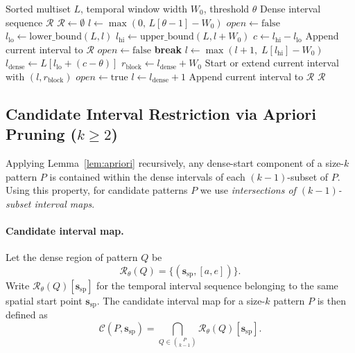 \begin{algorithm}[t]
\caption{Duplicate-aware dense interval computation for a fixed spatial start point}
\label{alg:t_stride}
\begin{algorithmic}[1]
\Require Sorted multiset $L$, temporal window width $W_0$, threshold $\theta$
\Ensure Dense interval sequence $\mathcal{R}$
\State $\mathcal{R} \leftarrow \emptyset$
\State $l \leftarrow \max(0,\, L[\theta-1] - W_0)$
\State $\mathit{open} \leftarrow \mathrm{false}$
  \State $l_{\mathrm{lo}} \leftarrow \mathrm{lower\_bound}(L, l)$
  \State $l_{\mathrm{hi}} \leftarrow \mathrm{upper\_bound}(L, l + W_0)$
  \State $c \leftarrow l_{\mathrm{hi}} - l_{\mathrm{lo}}$
      \State Append current interval to $\mathcal{R}$
      \State $\mathit{open} \leftarrow \mathrm{false}$
    \EndIf
     \textbf{break} \EndIf
    \State $l \leftarrow \max(l+1,\; L[l_{\mathrm{hi}}] - W_0)$
  \Else
    \State $l_{\mathrm{dense}} \leftarrow L[l_{\mathrm{lo}} + (c-\theta)]$
    \State $r_{\mathrm{block}} \leftarrow l_{\mathrm{dense}} + W_0$
    \State Start or extend current interval with $(l, r_{\mathrm{block}})$
    \State $\mathit{open} \leftarrow \mathrm{true}$
    \State $l \leftarrow l_{\mathrm{dense}} + 1$
  \EndIf
\EndWhile
{}
  \State Append current interval to $\mathcal{R}$
\EndIf
\State \Return $\mathcal{R}$
\end{algorithmic}
\end{algorithm}

\subsection{Candidate Interval Restriction via Apriori Pruning ($k \geq 2$)}\label{sec:alg_k2}

Applying Lemma~\ref{lem:apriori} recursively,
any dense-start component of a size-$k$ pattern $P$
is contained within the dense intervals
of each $(k{-}1)$-subset of $P$.
Using this property,
for candidate patterns $P$ we use
\emph{intersections of $(k{-}1)$-subset interval maps}.

\paragraph{Candidate interval map.}
Let the dense region of pattern $Q$ be
\[
  \mathcal{R}_\theta(Q)
  = \{(\bm{s}_{\mathrm{sp}}, [a,e])\}.
\]
Write $\mathcal{R}_\theta(Q)[\bm{s}_{\mathrm{sp}}]$
for the temporal interval sequence
belonging to the same spatial start point $\bm{s}_{\mathrm{sp}}$.
The candidate interval map for a size-$k$ pattern $P$ is then defined as
\begin{equation}\label{eq:candidate_cells}
  \mathcal{C}(P,\bm{s}_{\mathrm{sp}})
  =
  \bigcap_{Q \in \binom{P}{k-1}}
  \mathcal{R}_\theta(Q)[\bm{s}_{\mathrm{sp}}].
\end{equation}

